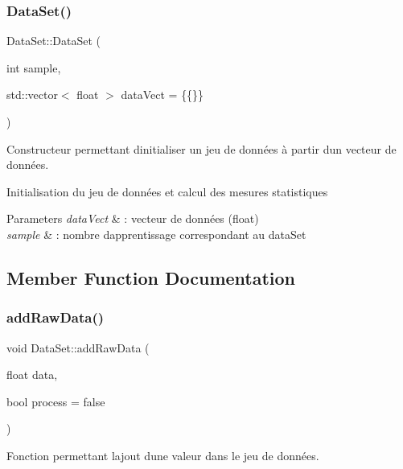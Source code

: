 \subsubsection{\texorpdfstring{Data\+Set()}{DataSet()}}
{\footnotesize\ttfamily Data\+Set\+::\+Data\+Set (\begin{DoxyParamCaption}\item[{int}]{sample,  }\item[{std\+::vector$<$ float $>$}]{data\+Vect = {\ttfamily \{\{\}\}} }\end{DoxyParamCaption})}



Constructeur permettant d\textquotesingle{}initialiser un jeu de données à partir d\textquotesingle{}un vecteur de données. 

Initialisation du jeu de données et calcul des mesures statistiques 
\begin{DoxyParams}{Parameters}
{\em data\+Vect} & \+: vecteur de données (float) \\
\hline
{\em sample} & \+: nombre d\textquotesingle{}apprentissage correspondant au data\+Set \\
\hline
\end{DoxyParams}


\subsection{Member Function Documentation}
\mbox{\label{classDataSet_ac2453c8cd424ed33b941363a45c009f8}} 
\subsubsection{\texorpdfstring{add\+Raw\+Data()}{addRawData()}\hspace{0.1cm}{\footnotesize\ttfamily [1/2]}}
{\footnotesize\ttfamily void Data\+Set\+::add\+Raw\+Data (\begin{DoxyParamCaption}\item[{float}]{data,  }\item[{bool}]{process = {\ttfamily false} }\end{DoxyParamCaption})}



Fonction permettant l\textquotesingle{}ajout d\textquotesingle{}une valeur dans le jeu de données. 


